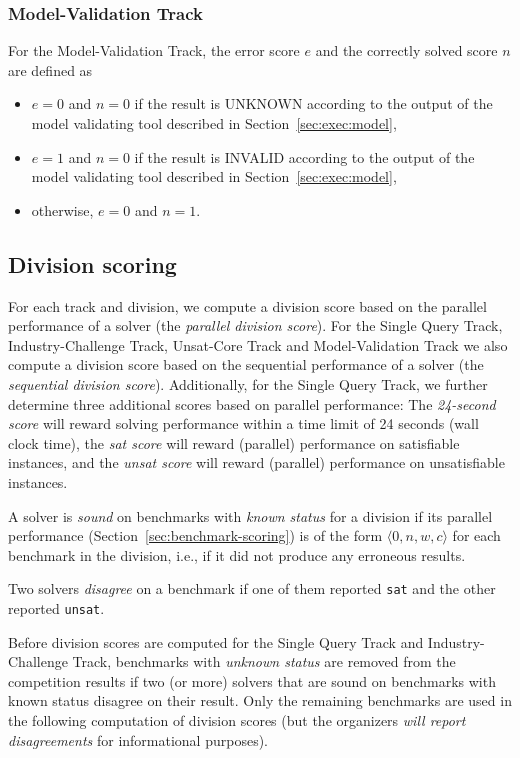 \documentclass[12pt]{article}
\newcommand{\maintrack}{Single Query Track\xspace}
\newcommand{\ucoretrack}{Unsat-Core Track\xspace}
\newcommand{\mvaltrack}{Model-Validation Track\xspace}
\newcommand{\challtrack}{Industry-Challenge Track\xspace}
\begin{document}
\subsubsection{\mvaltrack}
  For the \mvaltrack, the error score $e$ and the correctly solved score $n$
  are defined as
  \begin{itemize}
  \item $e=0$ and $n=0$ if the result is UNKNOWN according to the output of
    the model validating tool described in Section~\ref{sec:exec:model},
  \item $e=1$ and $n=0$ if the result is INVALID according to the output of
    the model validating tool described in Section~\ref{sec:exec:model},
  \item otherwise, $e=0$ and $n=1$.
  \end{itemize}

\subsection{Division scoring}
\label{sec:division-scoring}

For each track and division, we compute a division score based on the parallel
performance of a solver (the \emph{parallel division score}).  For the
\maintrack, \challtrack, \ucoretrack and \mvaltrack we also compute a division
score based on the sequential performance of a solver (the \emph{sequential
division score}).  Additionally, for the \maintrack, we further determine three
additional scores based on parallel performance: The \emph{24-second score}
will reward solving performance within a time limit of 24 seconds (wall clock
time), the \emph{sat score} will reward (parallel) performance on satisfiable
instances, and the \emph{unsat score} will reward (parallel) performance on
unsatisfiable instances.

A solver is \emph{sound} on benchmarks with \emph{known status} for a division
if its parallel performance (Section~\ref{sec:benchmark-scoring}) is of the
form $\langle 0, n, w, c\rangle$ for each benchmark in the division, i.e., if
it did not produce any erroneous results.

Two solvers \emph{disagree} on a benchmark if one of them reported \texttt{sat}
and the other reported \texttt{unsat}.

Before division scores are computed for the \maintrack and \challtrack,
benchmarks with \emph{unknown status} are removed from the competition results
if two (or more) solvers that are sound on benchmarks with known status
disagree on their result.
%
Only the remaining benchmarks are used in the following computation of division
scores (but the organizers \emph{will report disagreements} for informational
purposes).
\end{document}
